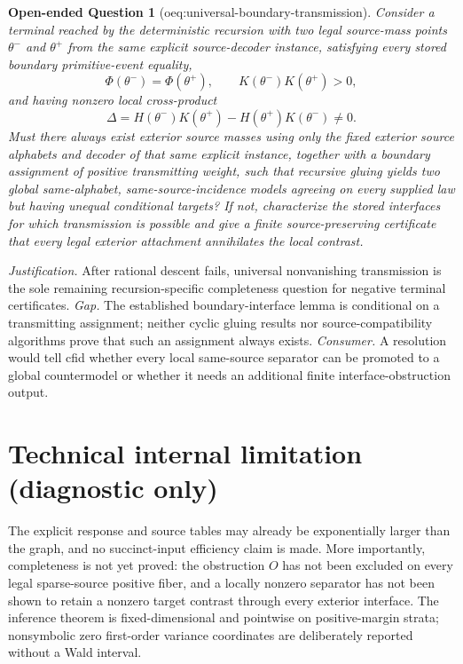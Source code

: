 \documentclass{article}
\newtheorem{openendedquestion}{Open-ended Question}
\begin{document}
\begin{openendedquestion}[oeq:universal-boundary-transmission]\label{oeq:universal-boundary-transmission}
Consider a terminal reached by the deterministic recursion with two legal source-mass points \(\theta^-\) and \(\theta^+\) from the same explicit source-decoder instance, satisfying every stored boundary primitive-event equality,
\[
 \Phi(\theta^-)=\Phi(\theta^+),\qquad
 K(\theta^-)K(\theta^+)>0,
\]
and having nonzero local cross-product
\[
 \Delta=H(\theta^-)K(\theta^+)-H(\theta^+)K(\theta^-)\ne0.
\]
Must there always exist exterior source masses using only the fixed exterior source alphabets and decoder of that same explicit instance, together with a boundary assignment of positive transmitting weight, such that recursive gluing yields two global same-alphabet, same-source-incidence models agreeing on every supplied law but having unequal conditional targets?  If not, characterize the stored interfaces for which transmission is possible and give a finite source-preserving certificate that every legal exterior attachment annihilates the local contrast.
\end{openendedquestion}
\par\smallskip\noindent \textit{Justification.} After rational descent fails, universal nonvanishing transmission is the sole remaining recursion-specific completeness question for negative terminal certificates. \textit{Gap.} The established boundary-interface lemma is conditional on a transmitting assignment; neither cyclic gluing results nor source-compatibility algorithms prove that such an assignment always exists. \textit{Consumer.} A resolution would tell cfid whether every local same-source separator can be promoted to a global countermodel or whether it needs an additional finite interface-obstruction output.

\section*{Technical internal limitation (diagnostic only)}

The explicit response and source tables may already be exponentially larger than the graph, and no succinct-input efficiency claim is made.  More importantly, completeness is not yet proved: the obstruction \(O\) has not been excluded on every legal sparse-source positive fiber, and a locally nonzero separator has not been shown to retain a nonzero target contrast through every exterior interface.  The inference theorem is fixed-dimensional and pointwise on positive-margin strata; nonsymbolic zero first-order variance coordinates are deliberately reported without a Wald interval.
\end{document}
